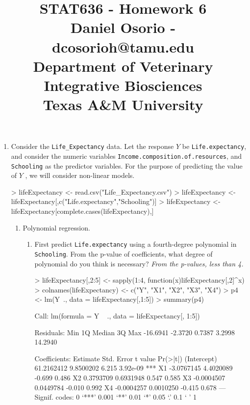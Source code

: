 \documentclass[12pt,a4paper]{paper}
\begin{document}
\title{STAT636 - Homework 6\\\small{Daniel Osorio - dcosorioh@tamu.edu\\Department of Veterinary Integrative Biosciences\\Texas A\&M University}}
\maketitle

\begin{enumerate}
\item Consider the \texttt{Life\_Expectancy} data. Let the response $Y$ be \texttt{Life.expectancy}, and consider the numeric variables \texttt{Income.composition.of.resources}, and \texttt{Schooling} as the predictor variables. For the purpose of predicting the value of $Y$ , we will consider non-linear models.
\begin{Schunk}
\begin{Sinput}
> lifeExpectancy <- read.csv("Life_Expectancy.csv")
> lifeExpectancy <- lifeExpectancy[,c("Life.expectancy","Schooling")]
> lifeExpectancy <- lifeExpectancy[complete.cases(lifeExpectancy),]
\end{Sinput}
\end{Schunk}
\begin{enumerate}
\item Polynomial regression.
\begin{enumerate}
\item First predict \texttt{Life.expectancy} using a fourth-degree polynomial in \texttt{Schooling}. From the p-value of coefficients, what degree of polynomial do you think is necessary? \textit{From the p-values, less than 4.}
\begin{Schunk}
\begin{Sinput}
> lifeExpectancy[,2:5] <- sapply(1:4, function(x){lifeExpectancy[,2]^x})
> colnames(lifeExpectancy) <- c("Y", "X1", "X2", "X3", "X4")
> p4 <- lm(Y~., data = lifeExpectancy[,1:5])
> summary(p4)
\end{Sinput}
\begin{Soutput}
Call:
lm(formula = Y ~ ., data = lifeExpectancy[, 1:5])

Residuals:
     Min       1Q   Median       3Q      Max 
-16.6941  -2.3720   0.7387   3.2998  14.2940 

Coefficients:
              Estimate Std. Error t value Pr(>|t|)    
(Intercept) 61.2162412  9.8500202   6.215 3.92e-09 ***
X1          -3.0767145  4.4020089  -0.699    0.486    
X2           0.3793709  0.6931948   0.547    0.585    
X3          -0.0004507  0.0449784  -0.010    0.992    
X4          -0.0004257  0.0010250  -0.415    0.678    
---
Signif. codes:  0 ‘***’ 0.001 ‘**’ 0.01 ‘*’ 0.05 ‘.’ 0.1 ‘ ’ 1


\end{Soutput}
\end{Schunk}
\end{enumerate}
\end{enumerate}
\end{enumerate}
\end{document}
